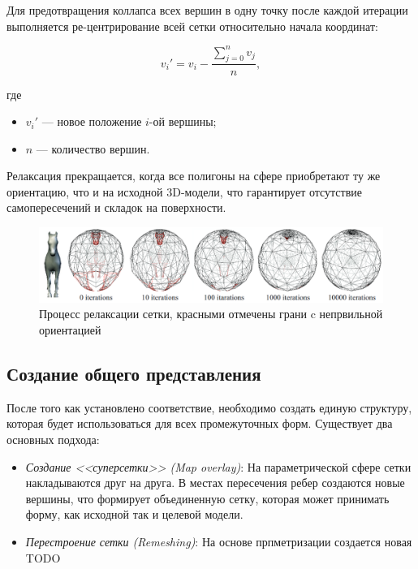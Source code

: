 	Для предотвращения коллапса всех вершин в одну точку после каждой итерации выполняется ре-центрирование всей сетки относительно начала координат:
	
	\begin{equation}
		v_i' = v_i - \frac{\sum_{j = 0}^{n} v_j}{n},
	\end{equation}
	
	где
	\begin{itemize}
		\item $v_i'$ --- новое положение $i$-ой вершины;
		\item $n$ --- количество вершин.
	\end{itemize}
	
	Релаксация прекращается, когда все полигоны на сфере приобретают ту же ориентацию, что и на исходной 3D-модели, что гарантирует отсутствие самопересечений и складок на поверхности.
	
	
	\begin{figure}[H]
		\centering
		\includegraphics[width=\textwidth]{../inc/images/relaxation}
		\caption{Процесс релаксации сетки, красными отмечены грани c непрвильной ориентацией}
		\label{fig:relaxation}
	\end{figure}
	
	
    \subsection{Создание общего представления}
    После того как установлено соответствие, необходимо создать единую структуру, которая будет использоваться для всех промежуточных форм. Существует два основных подхода:
    \begin{itemize}
        \item \textit{Создание <<суперсетки>> (Map overlay)}\cite{alexa}: На параметрической сфере сетки накладываются друг на друга. В местах пересечения ребер создаются новые вершины, что формирует объединенную сетку, которая может принимать форму, как исходной так и целевой модели.
        \item \textit{Перестроение сетки (Remeshing)}\cite{alexa}: На основе прпметризации создается новая TODO
    \end{itemize}

